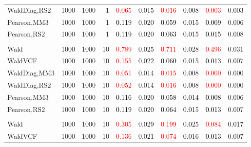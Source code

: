 \documentclass[
]{article}
\begin{document}
\begin{table}[H]
{\begin{tabular}[t]{lrrrrrrlrr}
\hspace{1em}WaldDiag,RS2 & 1000 & 1000 & 1 & \textcolor{red}{0.065} & 0.015 & \textcolor{red}{0.016} & 0.008 & \textcolor{red}{0.003} & 0.003\\
\hspace{1em}Pearson,MM3 & 1000 & 1000 & 1 & \textcolor{black}{0.119} & 0.020 & \textcolor{black}{0.059} & 0.015 & \textcolor{black}{0.009} & 0.006\\
\hspace{1em}Pearson,RS2 & 1000 & 1000 & 1 & \textcolor{black}{0.119} & 0.020 & \textcolor{black}{0.063} & 0.015 & \textcolor{black}{0.015} & 0.008\\
\addlinespace[0.3em]
\multicolumn{10}{l}{\textbf{1F 15V}}\\
\hspace{1em}Wald & 1000 & 1000 & 10 & \textcolor{red}{0.789} & 0.025 & \textcolor{red}{0.711} & 0.028 & \textcolor{red}{0.496} & 0.031\\
\hspace{1em}WaldVCF & 1000 & 1000 & 10 & \textcolor{red}{0.155} & 0.022 & \textcolor{black}{0.060} & 0.015 & \textcolor{black}{0.013} & 0.007\\
\hspace{1em}WaldDiag,MM3 & 1000 & 1000 & 10 & \textcolor{red}{0.051} & 0.014 & \textcolor{red}{0.015} & 0.008 & \textcolor{red}{0.000} & 0.000\\
\hspace{1em}WaldDiag,RS2 & 1000 & 1000 & 10 & \textcolor{red}{0.052} & 0.014 & \textcolor{red}{0.016} & 0.008 & \textcolor{red}{0.000} & 0.000\\
\hspace{1em}Pearson,MM3 & 1000 & 1000 & 10 & \textcolor{black}{0.116} & 0.020 & \textcolor{black}{0.058} & 0.014 & \textcolor{black}{0.008} & 0.006\\
\hspace{1em}Pearson,RS2 & 1000 & 1000 & 10 & \textcolor{black}{0.119} & 0.020 & \textcolor{black}{0.064} & 0.015 & \textcolor{black}{0.013} & 0.007\\
\addlinespace[0.3em]
\multicolumn{10}{l}{\textbf{2F 10V}}\\
\hspace{1em}Wald & 1000 & 1000 & 10 & \textcolor{red}{0.305} & 0.029 & \textcolor{red}{0.199} & 0.025 & \textcolor{red}{0.084} & 0.017\\
\hspace{1em}WaldVCF & 1000 & 1000 & 10 & \textcolor{red}{0.136} & 0.021 & \textcolor{red}{0.074} & 0.016 & \textcolor{black}{0.013} & 0.007\\

\end{tabular}}
\end{table}
\end{document}
